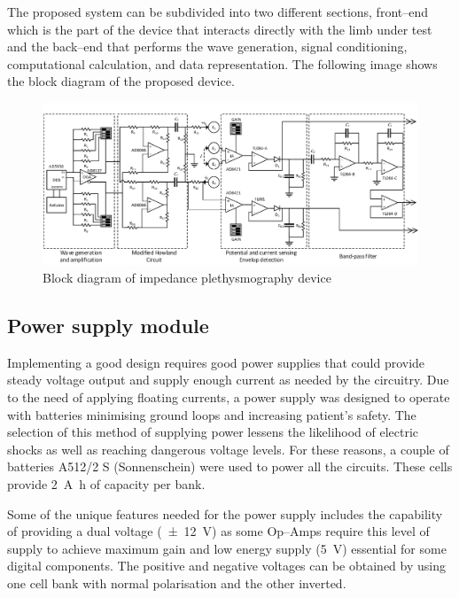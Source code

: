The proposed system can be subdivided into two different sections, front–end which is the part of the device that interacts directly with the limb under test and the back–end that performs the wave generation, signal conditioning, computational calculation, and data representation. The following image shows the block diagram of the proposed device.

\begin{figure}[!htpb]
	\centering
	\includegraphics[width=\textwidth,keepaspectratio]{figure2}
    \caption{Block diagram of impedance plethysmography device}
    \label{fig:block}
\end{figure}


\subsection{Power supply module}
Implementing a good design requires good power supplies that could provide steady voltage output and supply enough current as needed by the circuitry. Due to the need of applying floating currents, a power supply was designed to operate with batteries minimising ground loops and increasing patient's safety.  The selection of this method of supplying power lessens the likelihood of electric shocks as well as reaching dangerous voltage levels. For these reasons, a couple of batteries A512/2 S (Sonnenschein) were used to power all the circuits. These cells provide \SI{2}{\ampere\hour} of capacity per bank.

Some of the unique features needed for the power supply includes the capability of providing a dual voltage (\SI{\pm 12}{\volt}) as some Op–Amps require this level of supply to achieve maximum gain and low energy supply (\SI{5}{\volt}) essential for some digital components. The positive and negative voltages can be obtained by using one cell bank with normal polarisation and the other inverted. 

